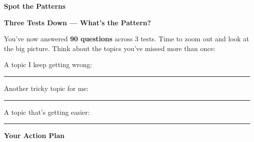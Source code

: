 \clearpage
\thispagestyle{empty}
{\sffamily

\begin{center}
{\fontsize{22}{26}\selectfont\bfseries\color{funOrange} \faBinoculars\hspace{3mm}Spot the Patterns\hspace{3mm}\faBinoculars}

\vspace{2mm}
{\color{funGray}\hrulefill}
\end{center}

\vspace{3mm}

\begin{tcolorbox}[
    enhanced,
    colback=funOrangeLight,
    colframe=funOrange!50,
    arc=10pt,
    boxrule=1.5pt,
    left=6mm, right=6mm, top=5mm, bottom=5mm,
]
{\large\bfseries\color{funOrangeDark} \faProjectDiagram\hspace{2mm}Three Tests Down — What's the Pattern?}

\vspace{2mm}

You've now answered \textbf{90 questions} across 3 tests. Time to zoom out and look at the big picture. Think about the topics you've missed more than once:

\vspace{3mm}

\faArrowRight\hspace{2mm}A topic I keep getting wrong: \rule[-2pt]{5cm}{0.5pt}

\vspace{2mm}

\faArrowRight\hspace{2mm}Another tricky topic for me: \rule[-2pt]{5cm}{0.5pt}

\vspace{2mm}

\faArrowRight\hspace{2mm}A topic that's getting easier: \rule[-2pt]{5cm}{0.5pt}
\end{tcolorbox}

\vspace{3mm}

\begin{tcolorbox}[
    enhanced,
    colback=funYellowLight,
    colframe=funYellow!60,
    arc=10pt,
    boxrule=1pt,
    left=6mm, right=6mm, top=4mm, bottom=4mm,
]
{\bfseries\color{funYellowDark} \faLightbulb\hspace{2mm}Your Action Plan}


\end{tcolorbox}}
